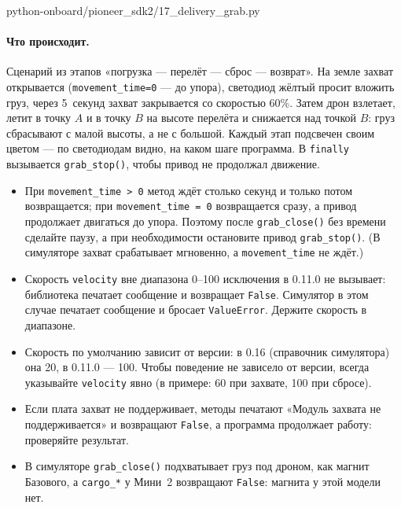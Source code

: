 \begin{codefile}[python]{python-onboard/pioneer_sdk2/17_delivery_grab.py}
\end{codefile}

\paragraph{Что происходит.} Сценарий из этапов «погрузка --- перелёт --- сброс --- возврат». На земле захват открывается (\verb|movement_time=0| --- до упора), светодиод жёлтый просит вложить груз, через 5~секунд захват закрывается со скоростью 60\%. Затем дрон взлетает, летит в точку $A$ и в точку $B$ на высоте перелёта и снижается над точкой $B$: груз сбрасывают с малой высоты, а не с большой. Каждый этап подсвечен своим цветом --- по светодиодам видно, на каком шаге программа. В \verb|finally| вызывается \verb|grab_stop()|, чтобы привод не продолжал движение.

\begin{infobox}
\begin{itemize}
    \item При \verb|movement_time > 0| метод ждёт столько секунд и только потом возвращается; при \verb|movement_time = 0| возвращается сразу, а привод продолжает двигаться до упора. Поэтому после \verb|grab_close()| без времени сделайте паузу, а при необходимости остановите привод \verb|grab_stop()|. (В симуляторе захват срабатывает мгновенно, а \verb|movement_time| не ждёт.)
    \item Скорость \verb|velocity| вне диапазона 0--100 исключения в 0.11.0 не вызывает: библиотека печатает сообщение и возвращает \verb|False|. Симулятор в этом случае печатает сообщение и бросает \verb|ValueError|. Держите скорость в диапазоне.
    \item Скорость по умолчанию зависит от версии: в 0.16 (справочник симулятора) она 20, в 0.11.0 --- 100. Чтобы поведение не зависело от версии, всегда указывайте \verb|velocity| явно (в примере: 60 при захвате, 100 при сбросе).
    \item Если плата захват не поддерживает, методы печатают «Модуль захвата не поддерживается» и возвращают \verb|False|, а программа продолжает работу: проверяйте результат.
    \item В симуляторе \verb|grab_close()| подхватывает груз под дроном, как магнит Базового, а \verb|cargo_*| у Мини~2 возвращают \verb|False|: магнита у этой модели нет.
\end{itemize}
\end{infobox}

